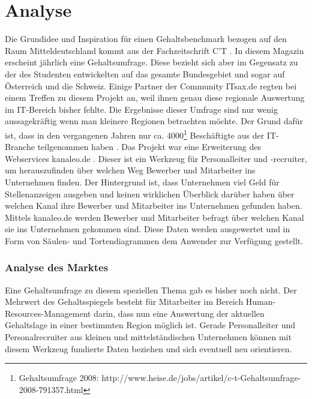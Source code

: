 \part{Analyse}
Die Grundidee und Inspiration für einen Gehaltsbenchmark bezogen auf den Raum Mitteldeutschland kommt aus der Fachzeitschrift C'T \citep{ct}. 
In diesem Magazin erscheint jährlich eine Gehaltsumfrage. Diese bezieht sich aber im Gegensatz zu der des Studenten entwickelten auf das gesamte Bundesgebiet und sogar auf Österreich und die Schweiz. Einige Partner der Community ITsax.de regten bei einem Treffen zu diesem Projekt an, weil ihnen genau diese regionale Auswertung im IT-Bereich bisher fehlte.
Die Ergebnisse dieser Umfrage sind nur wenig aussagekräftig wenn man kleinere Regionen betrachten möchte. 
Der Grund dafür ist, dass in den vergangenen Jahren nur ca. 4000\footnote{Gehaltsumfrage 2008: http://www.heise.de/jobs/artikel/c-t-Gehaltsumfrage-2008-791357.html} Beschäftigte aus der IT-Branche teilgenommen haben \citep{ct}.
Das Projekt war eine Erweiterung des Webservices kanaleo.de \citep{kanaleo}. Dieser ist ein Werkzeug f\"ur Personalleiter und -recruiter, um herauszufinden über welchen Weg Bewerber und Mitarbeiter ins Unternehmen finden. Der Hintergrund ist, dass Unternehmen viel Geld f\"ur Stellenanzeigen ausgeben und keinen wirklichen Überblick darüber haben über welchen Kanal ihre Bewerber und Mitarbeiter ins Unternehmen gefunden haben. Mittels kanaleo.de werden Bewerber und Mitarbeiter befragt über welchen Kanal sie ins Unternehmen gekommen sind. Diese Daten werden ausgewertet und in Form von Säulen- und Tortendiagrammen dem Anwender zur Verfügung gestellt. 
\section{Analyse des Marktes}
Eine Gehaltsumfrage zu diesem speziellen Thema gab es bisher noch nicht. 
Der Mehrwert des Gehaltsspiegels besteht für Mitarbeiter im Bereich Human-Resources-Management darin, dass nun eine Auswertung der aktuellen Gehaltslage in einer bestimmten Region möglich ist. 
Gerade Personalleiter und Personalrecruiter aus kleinen und mittelständischen Unternehmen können mit diesem Werkzeug fundierte Daten beziehen und sich eventuell neu orientieren. 
